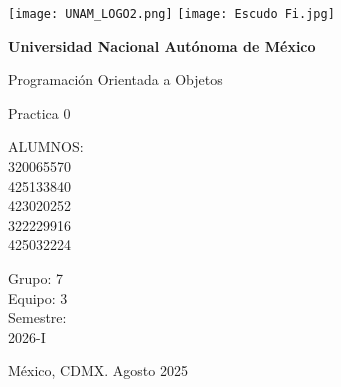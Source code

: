 \documentclass[letterpaper,12pt,oneside]{article}
\begin{document}
\begin{titlepage}
		\setlength{\parindent}{0pt} \setlength{\parskip}{0pt}
	
		\begin{center}
			\vfill 
			
			\begin{minipage}{\textwidth}
				
				
				\begin{center}
					\texttt{[image: UNAM\_LOGO2.png]}
                    \texttt{[image: Escudo Fi.jpg]}	
				\end{center} 	
				\begin{center}
					\Huge\textbf{Universidad Nacional Autónoma de México}
				\end{center} 
				
			\end{minipage}
				
			\vfill
			

			
			\begin{center}
				\vfill
				\large Programación Orientada a Objetos 
			\end{center}
			
			\begin{center}
				\vspace*{1cm}
				{\huge Practica 0}\\
				\vspace*{1cm}
				
				\begin{center}
					ALUMNOS: \\
					\large 320065570 \\
                    \large 425133840 \\
                    \large 423020252 \\
                    \large 322229916 \\
                    \large 425032224
                    
				\end{center}
				
				\bigskip
				
				Grupo: 7\\
                Equipo: 3
				\\
				Semestre: \\
                2026-I
			\end{center}
			
			\vfill
			
			\begin{center}
				{México, CDMX. Agosto 2025}\\
			\end{center}
			\cleardoublepage
		\end{center}
	\end{titlepage}
 
\end{document}
